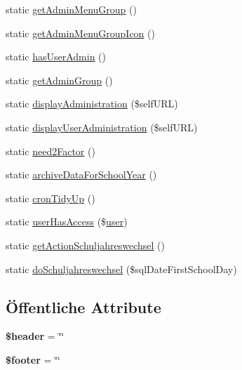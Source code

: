 \begin{DoxyCompactItemize}
\item 
static \mbox{\hyperlink{class_abstract_page_af8f1a5ff801475d561c4e20e89a80095}{get\+Admin\+Menu\+Group}} ()
\item 
static \mbox{\hyperlink{class_abstract_page_acab9ef8989c4f22e53805bf077e81463}{get\+Admin\+Menu\+Group\+Icon}} ()
\item 
static \mbox{\hyperlink{class_abstract_page_a1e1df9687e56910c54512386d50a88ce}{has\+User\+Admin}} ()
\item 
static \mbox{\hyperlink{class_abstract_page_acda6df20abb2331922ea36b01c695fcd}{get\+Admin\+Group}} ()
\item 
static \mbox{\hyperlink{class_abstract_page_afde426924e0eed6b25b17691b4129346}{display\+Administration}} (\$self\+U\+RL)
\item 
static \mbox{\hyperlink{class_abstract_page_afd1a2e3465a867e9f12821a9f716104d}{display\+User\+Administration}} (\$self\+U\+RL)
\item 
static \mbox{\hyperlink{class_abstract_page_af3ba7e0104142ca2c241cce7f88cc116}{need2\+Factor}} ()
\item 
static \mbox{\hyperlink{class_abstract_page_aeb7d1b561582650d56223314cc5d4043}{archive\+Data\+For\+School\+Year}} ()
\item 
static \mbox{\hyperlink{class_abstract_page_a6d3e469dc3dcc986d3ebfc6cc7eb6197}{cron\+Tidy\+Up}} ()
\item 
static \mbox{\hyperlink{class_abstract_page_ae980229e15fcb3d471ae90bbb10f6d9d}{user\+Has\+Access}} (\$\mbox{\hyperlink{classuser}{user}})
\item 
static \mbox{\hyperlink{class_abstract_page_a489af76b365b0b30c3390eb602a4d85b}{get\+Action\+Schuljahreswechsel}} ()
\item 
static \mbox{\hyperlink{class_abstract_page_a9994ef2dafc15187e8b6f2e8548ec5df}{do\+Schuljahreswechsel}} (\$sql\+Date\+First\+School\+Day)
\end{DoxyCompactItemize}
\subsection*{Öffentliche Attribute}
\begin{DoxyCompactItemize}
\item 
\mbox{\label{class_abstract_page_acfcf12cd1e21c73064e34ca063882a3e}} 
{\bfseries \$header} = \char`\"{}\char`\"{}
\item 
\mbox{\label{class_abstract_page_ab89ccbf69821469a5a531cb894ee8770}} 
{\bfseries \$footer} = \char`\"{}\char`\"{}
\end{DoxyCompactItemize}

